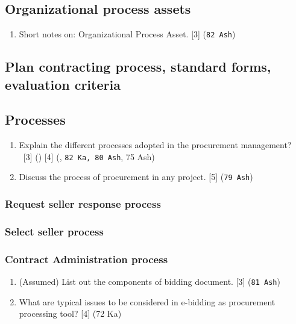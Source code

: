 \documentclass[12pt]{article}
\newcommand{\enter}{\\\textcolor{white}{1}}
\begin{document}
  \subsection{Organizational process assets}
    \begin{enumerate}
      \item Short notes on: Organizational Process Asset. \hfill [3] (\texttt{82 Ash})
    \end{enumerate}

  \subsection{Plan contracting process, standard forms, evaluation criteria}
  \subsection{Processes}
    \begin{enumerate}
      \item Explain the different processes adopted in the procurement management?
        \enter\hfill [3] () [4] (, \texttt{82 Ka, 80 Ash}, 75 Ash)

      \item Discuss the process of procurement in any project. \hfill [5] (\texttt{79 Ash})
    \end{enumerate}

    \subsubsection{Request seller response process}
    \subsubsection{Select seller process}
    \subsubsection{Contract Administration process}
      \begin{enumerate}
        \item (Assumed) List out the components of bidding document. \hfill [3] (\texttt{81 Ash})

        \item What are typical issues to be considered in e-bidding as procurement processing tool? \hfill [4] (72 Ka)
      \end{enumerate}
\end{document}
